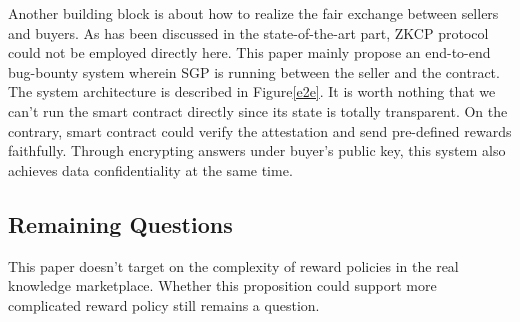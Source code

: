 \documentclass[conference]{IEEEtran}
\begin{document}
Another building block is about how to realize the fair exchange between sellers and buyers.
%
As has been discussed in the state-of-the-art part, ZKCP protocol could not be employed directly here.
%
This paper mainly propose an end-to-end bug-bounty system wherein SGP is running between the seller and the contract.
%
The system architecture is described in Figure\ref{e2e}.
%
It is worth nothing that we can't run the smart contract directly since its state is totally transparent.
%
On the contrary, smart contract could verify the attestation and send pre-defined rewards faithfully.
%
Through encrypting answers under buyer's public key, this system also achieves data confidentiality at the same time.

\subsection{Remaining Questions}
This paper doesn't target on the complexity of reward policies in the real knowledge marketplace.
%
Whether this proposition could support more complicated reward policy still remains a question. 



\end{document}
